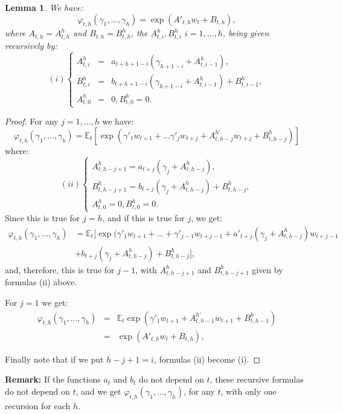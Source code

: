 \documentclass[
  12pt,
]{book}
\newtheorem{lemma}{Lemma}[chapter]
\theoremstyle{definition}
\theoremstyle{definition}
\theoremstyle{definition}
\theoremstyle{definition}
\theoremstyle{remark}
\begin{document}
\begin{lemma}
\protect\hypertarget{lem:MHLT}{}\label{lem:MHLT}We have:
\[
\varphi_{t,h}(\gamma_1,\dots,\gamma_h) = \exp(A'_{t,h} w_t + B_{t,h}),
\]
where \(A_{t,h} = A^h_{t,h}\) and \(B_{t,h} = B^h_{t,h}\), the \(A^h_{t,i}, B^h_{t,i}\) \(i = 1,\dots,h\), being given recursively by:
\[
(i) \left\{
\begin{array}{ccl}
A^h_{t,i} &=& a_{t+h+1-i}(\gamma_{h+1-i} + A^h_{t,i-1}), \\
B^h_{t,i} &=& b_{t+h+1-i}(\gamma_{h+1-i} + A^h_{t,i-1}) + B^h_{t,i-1}, \\
A^h_{t,0} &=& 0, B^h_{t,0} = 0.
\end{array}
\right.
\]
\end{lemma}

\begin{proof}
For any \(j=1,\dots,h\) we have:
\[
\varphi_{t,h}(\gamma_1,\dots,\gamma_h) = \mathbb{E}_t[\exp(\gamma'_1 w_{t+1}+\dots\gamma'_j w_{t+j}+A^{h'}_{t,h-j}w_{t+j}+B^h_{t,h-j})]
\]
where:
\[
(ii) \left\{
\begin{array}{l}
A^h_{t,h-j+1} = a_{t+j}(\gamma_{j} + A^h_{t,h-j}), \\
B^h_{t,h-j+1} = b_{t+j}(\gamma_{j} + A^h_{t,h-j}) + B^h_{t,h-j}, \\
A^h_{t,0} = 0, B^h_{t,0} = 0.
\end{array}
\right.
\]
Since this is true for \(j=h\), and if this is true for \(j\), we get:
\[
\begin{array}{ll}
\varphi_{t,h}(\gamma_1,\dots,\gamma_h) & = \mathbb{E}_t [\exp(\gamma'_1 w_{t+1}+\dots+\gamma'_{j-1}w_{t+j-1}+a'_{t+j}(\gamma_j+A^h_{t,h-j})w_{t+j-1} \\
& + b_{t+j}(\gamma_j+A^h_{t,h-j})+B^h_{t,h-j}],
\end{array}
\]
and, therefore, this is true for \(j-1\), with \(A^h_{t,h-j+1}\) and \(B^h_{t,h-j+1}\) given by formulas (ii) above.

For \(j=1\) we get:
\begin{eqnarray*}
\varphi_{t,h}(\gamma_1,\dots,\gamma_h) &=& \mathbb{E}_t \exp(\gamma'_1 w_{t+1}+A^{h'}_{t,h-1}w_{t+1}+B^h_{t,h-1}) \\
&=& \exp(A'_{t,h} w_t+B_{t,h}),
\end{eqnarray*}

Finally note that if we put \(h-j+1 = i\), formulas (ii) become (i).
\end{proof}

\textbf{Remark:} If the functions \(a_{t}\) and \(b_{t}\) do not depend on \(t\), these recursive formulas do not depend on \(t\), and we get \(\varphi_{t,h}(\gamma_1,\dots,\gamma_h)\), for any \(t\), with only one recursion for each \(h\).
\end{document}

